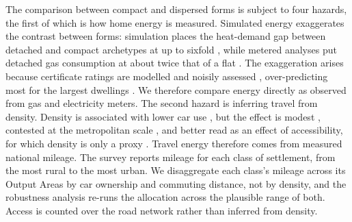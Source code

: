 \documentclass[pdflatex,sn-nature]{sn-jnl}
\begin{document}
The comparison between compact and dispersed forms is subject to four hazards, the first of which is how home energy is measured. Simulated energy exaggerates the contrast between forms: simulation places the heat-demand gap between detached and compact archetypes at up to sixfold \citep{rode2014}, while metered analyses put detached gas consumption at about twice that of a flat \citep{need2024,ehs2024,wyatt2013}. The exaggeration arises because certificate ratings are modelled and noisily assessed \citep{crawley2019}, over-predicting most for the largest dwellings \citep{firth2024}. We therefore compare energy directly as observed from gas and electricity meters. The second hazard is inferring travel from density. Density is associated with lower car use \citep{newman1989}, but the effect is modest \citep{ewing2017,echenique2012}, contested at the metropolitan scale \citep{gaigne2012,mindali2004}, and better read as an effect of accessibility, for which density is only a proxy \citep{ewing2018,ellder2022}. Travel energy therefore comes from measured national mileage. The survey reports mileage for each class of settlement, from the most rural to the most urban. We disaggregate each class's mileage across its Output Areas by car ownership and commuting distance, not by density, and the robustness analysis re-runs the allocation across the plausible range of both. Access is counted over the road network rather than inferred from density.
\end{document}
